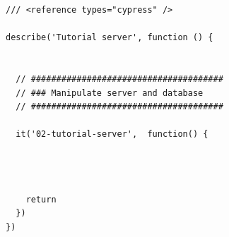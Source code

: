 
\begin{verbatim}
/// <reference types="cypress" />

describe('Tutorial server', function () {


  // ######################################
  // ### Manipulate server and database
  // ######################################

  it('02-tutorial-server',  function() {




\end{verbatim}



\begin{verbatim}
    return
  })
})

\end{verbatim}
